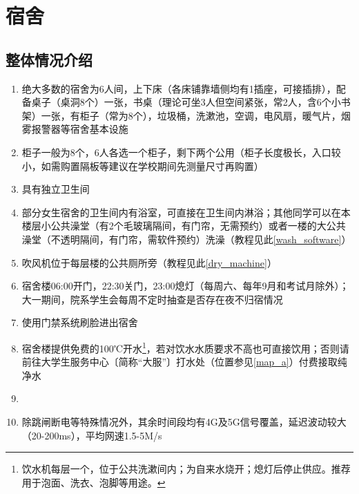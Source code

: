 \chapter[宿舍]{宿舍}
\section[整体情况介绍]{整体情况介绍}
\begin{enumerate}
    \item 绝大多数的宿舍为6人间，上下床（各床铺靠墙侧均有1插座，可接插排），配备桌子（桌洞8个）一张，书桌（理论可坐3人但空间紧张，常2人，含6个小书架）一张，有柜子（常为8个），垃圾桶，洗漱池，空调，电风扇，暖气片，烟雾报警器等宿舍基本设施
    \item 柜子一般为8个，6人各选一个柜子，剩下两个公用（柜子长度极长，入口较小，如需购置隔板等建议在学校期间先测量尺寸再购置）
    \item 具有独立卫生间
    \item 部分女生宿舍的卫生间内有浴室，可直接在卫生间内淋浴；其他同学可以在本楼层小公共澡堂（有2个毛玻璃隔间，有门帘，无需预约）或者一楼的大公共澡堂（不透明隔间，有门帘，需软件预约）洗澡（教程见此\uline{\ref{wash_software}}）
    \item 吹风机位于每层楼的公共厕所旁（教程见此\uline{\ref{dry_machine}}）
    \item 宿舍楼06:00开门，22:30关门，23:00熄灯（每周六、每年9月和考试月除外）；大一期间，院系学生会每周不定时抽查是否存在夜不归宿情况
    \item 使用门禁系统刷脸进出宿舍
    \item 宿舍楼提供免费的100℃开水\footnote{饮水机每层一个，位于公共洗漱间内；为自来水烧开；熄灯后停止供应。推荐用于泡面、洗衣、泡脚等用途。}，若对饮水水质要求不高也可直接饮用；否则请前往大学生服务中心〔简称“大服”〕打水处（位置参见\uline{\ref{map_a}}）付费接取纯净水
    \item \textbf{}
    \item 除跳闸断电等特殊情况外，其余时间段均有4G及5G信号覆盖，延迟波动较大（20-200ms），平均网速1.5-5M/s
\end{enumerate}

